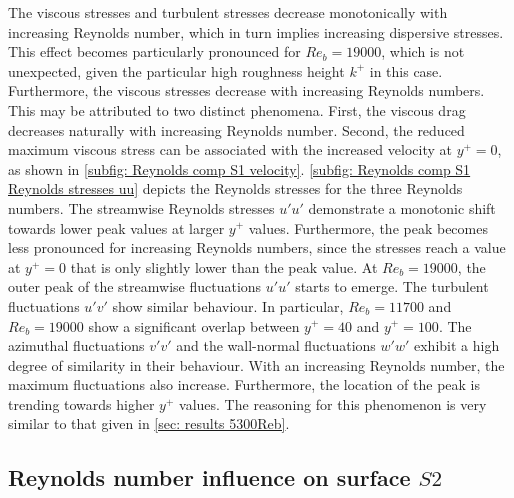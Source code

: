 The viscous stresses and turbulent stresses decrease monotonically with increasing Reynolds number, which in turn implies increasing dispersive stresses.
This effect becomes particularly pronounced for $Re_b = 19000$, which is not unexpected, given the particular high roughness height $k^+$ in this case.
Furthermore, the viscous stresses decrease with increasing Reynolds numbers.
This  may be attributed to two distinct phenomena.
First, the viscous drag decreases naturally with increasing Reynolds number.
Second, the reduced maximum viscous stress can be associated with the increased velocity at $y^+ = 0$, as shown in \autoref{subfig: Reynolds comp S1 velocity}.
\autoref{subfig: Reynolds comp S1 Reynolds stresses uu} depicts the Reynolds stresses for the three Reynolds numbers.
The streamwise Reynolds stresses $u'u'$ demonstrate a monotonic shift towards lower peak values at larger $y^+$ values.
Furthermore, the peak becomes less pronounced for increasing Reynolds numbers, since the stresses reach a value at $y^+ = 0$ that is only slightly lower than the peak value.
At $Re_b = 19000$, the outer peak of the streamwise fluctuations $u'u'$ starts to emerge.
The turbulent fluctuations $u'v'$ show similar behaviour.
In particular, $Re_b = 11700$ and $Re_b = 19000$ show a significant overlap between $y^+ = 40$ and $y^+ = 100$.
The azimuthal fluctuations $v'v'$ and the wall-normal fluctuations $w'w'$ exhibit a high degree of similarity in their behaviour.
With an increasing Reynolds number, the maximum fluctuations also increase.
Furthermore, the location of the peak is trending towards higher $y^+$ values.
The reasoning for this phenomenon is very similar to that given in \autoref{sec: results 5300Reb}.


\subsection{Reynolds number influence on surface $S2$}\label{subsec: Reynolds comp S2}

